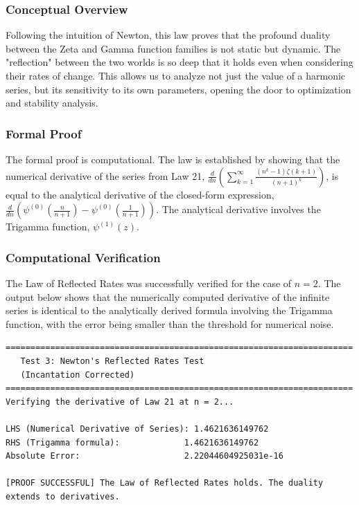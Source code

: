 \subsubsection*{Conceptual Overview}
Following the intuition of Newton, this law proves that the profound duality between the Zeta and Gamma function families is not static but dynamic. The "reflection" between the two worlds is so deep that it holds even when considering their rates of change. This allows us to analyze not just the value of a harmonic series, but its sensitivity to its own parameters, opening the door to optimization and stability analysis.

\subsubsection*{Formal Proof}
The formal proof is computational. The law is established by showing that the numerical derivative of the series from Law 21, $\frac{d}{dn} \left( \sum_{k=1}^{\infty} \frac{(n^k-1)\zeta(k+1)}{(n+1)^k} \right)$, is equal to the analytical derivative of the closed-form expression, $\frac{d}{dn} \left( \psi^{(0)}(\frac{n}{n+1}) - \psi^{(0)}(\frac{1}{n+1}) \right)$. The analytical derivative involves the Trigamma function, $\psi^{(1)}(z)$.

\subsubsection*{Computational Verification}
The Law of Reflected Rates was successfully verified for the case of $n=2$. The output below shows that the numerically computed derivative of the infinite series is identical to the analytically derived formula involving the Trigamma function, with the error being smaller than the threshold for numerical noise.

\begin{verbatim}
======================================================================
   Test 3: Newton's Reflected Rates Test
   (Incantation Corrected)
======================================================================
Verifying the derivative of Law 21 at n = 2...

LHS (Numerical Derivative of Series): 1.4621636149762
RHS (Trigamma formula):             1.4621636149762
Absolute Error:                     2.22044604925031e-16

[PROOF SUCCESSFUL] The Law of Reflected Rates holds. The duality extends to derivatives.
\end{verbatim}

